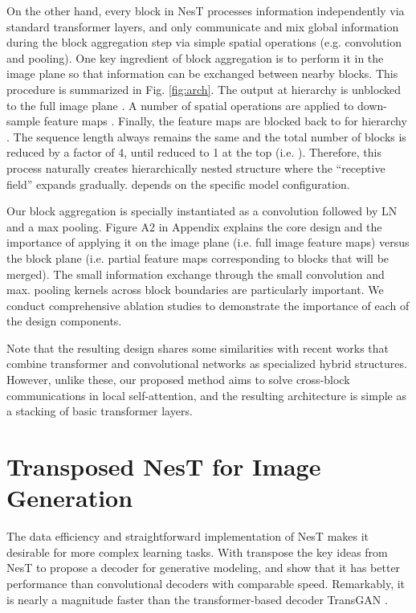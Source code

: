 \documentclass{article}
\newcommand{\OURS}{NesT\xspace}
\begin{document}
On the other hand, every block in \OURS processes information independently via standard transformer layers, and only communicate and mix global information during the block aggregation step via simple spatial operations (e.g. convolution and pooling). 
One key ingredient of block aggregation is to perform it in the image plane so that information can be exchanged between nearby blocks. 
This procedure is summarized in Fig. \ref{fig:arch}.
The output  at hierarchy  is unblocked to the full image plane . A number of spatial operations are applied to down-sample feature maps . 
Finally, the feature maps are blocked back to  for hierarchy . 
The sequence length  always remains the same and the total number of blocks is reduced by a factor of 4, until reduced to 1 at the top (i.e. ). 
Therefore, this process naturally creates hierarchically nested structure where the ``receptive field'' expands gradually.
 depends on the specific model configuration.

Our block aggregation is specially instantiated as a  convolution followed by LN and a  max pooling. 
Figure A2 in Appendix explains the core design and the importance of applying it on the image plane (i.e. full image feature maps) versus the block plane (i.e. partial feature maps corresponding to  blocks that will be merged). 
The small information exchange through the small convolution and max. pooling kernels across block boundaries are particularly important. 
We conduct comprehensive ablation studies to demonstrate the importance of each of the design components.


Note that the resulting design shares some similarities with recent works that combine transformer and convolutional networks \cite{wu2021cvt,yuan2021tokens,bello2021lambdanetworks} as specialized hybrid structures. 
However, unlike these, our proposed method aims to solve cross-block communications in local self-attention, and the resulting architecture is simple as a stacking of basic transformer layers. 

\section{Transposed \OURS for Image Generation}
The data efficiency and straightforward implementation of \OURS makes it desirable for more complex learning tasks. 
With transpose the key ideas from \OURS to propose a decoder for generative modeling, and show that it has better performance than convolutional decoders with comparable speed. 
Remarkably, it is nearly a magnitude faster than the transformer-based decoder TransGAN \cite{jiang2021transgan}. 
\end{document}
